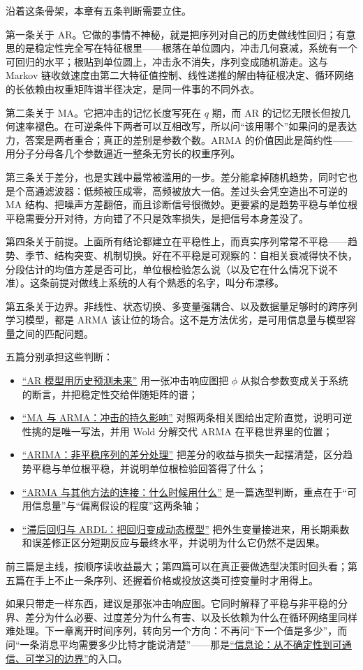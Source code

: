 沿着这条骨架，本章有五条判断需要立住。

第一条关于 AR。它做的事情不神秘，就是把序列对自己的历史做线性回归；有意思的是稳定性完全写在特征根里——根落在单位圆内，冲击几何衰减，系统有一个可回归的水平；根贴到单位圆上，冲击永不消失，序列变成随机游走。这与 Markov 链收敛速度由第二大特征值控制、线性递推的解由特征根决定、循环网络的长依赖由权重矩阵谱半径决定，是同一件事的不同外衣。

第二条关于 MA。它把冲击的记忆长度写死在 \(q\) 期，而 AR 的记忆无限长但按几何速率褪色。在可逆条件下两者可以互相改写，所以问``该用哪个''如果问的是表达力，答案是两者重合；真正的差别是参数个数。ARMA 的价值因此是简约性——用分子分母各几个参数逼近一整条无穷长的权重序列。

第三条关于差分，也是实践中最常被滥用的一步。差分能拿掉随机趋势，同时它也是个高通滤波器：低频被压成零，高频被放大一倍。差过头会凭空造出不可逆的 MA 结构、把噪声方差翻倍，而且诊断信号很微妙。更要紧的是趋势平稳与单位根平稳需要分开对待，方向错了不只是效率损失，是把信号本身差没了。

第四条关于前提。上面所有结论都建立在平稳性上，而真实序列常常不平稳——趋势、季节、结构突变、机制切换。好在不平稳是可观察的：自相关衰减得快不快，分段估计的均值方差是否可比，单位根检验怎么说（以及它在什么情况下说不准）。这条前提对做线上系统的人有个熟悉的名字，叫分布漂移。

第五条关于边界。非线性、状态切换、多变量强耦合、以及数据量足够时的跨序列学习模型，都是 ARMA 该让位的场合。这不是方法优劣，是可用信息量与模型容量之间的匹配问题。

五篇分别承担这些判断：

\begin{itemize}
\tightlist
\item \hyperref[sec:06-Random-Processes/06-ARMA-and-ARIMA/01]{``AR 模型用历史预测未来''} 用一张冲击响应图把 \(\phi\) 从拟合参数变成关于系统的断言，并把稳定性交给伴随矩阵的谱；
\item \hyperref[sec:06-Random-Processes/06-ARMA-and-ARIMA/02]{``MA 与 ARMA：冲击的持久影响''} 对照两条相关图给出定阶直觉，说明可逆性挑的是唯一写法，并用 Wold 分解交代 ARMA 在平稳世界里的位置；
\item \hyperref[sec:06-Random-Processes/06-ARMA-and-ARIMA/03]{``ARIMA：非平稳序列的差分处理''} 把差分的收益与损失一起摆清楚，区分趋势平稳与单位根平稳，并说明单位根检验回答得了什么；
\item \hyperref[sec:06-Random-Processes/06-ARMA-and-ARIMA/04]{``ARMA 与其他方法的连接：什么时候用什么''} 是一篇选型判断，重点在于``可用信息量''与``偏离假设的程度''这两条轴；
\item \hyperref[sec:06-Random-Processes/06-ARMA-and-ARIMA/05]{``滞后回归与 ARDL：把回归变成动态模型''} 把外生变量接进来，用长期乘数和误差修正区分短期反应与最终水平，并说明为什么它仍然不是因果。
\end{itemize}

前三篇是主线，按顺序读收益最大；第四篇可以在真正要做选型决策时回头看；第五篇在手上不止一条序列、还握着价格或投放这类可控变量时才用得上。

如果只带走一样东西，建议是那张冲击响应图。它同时解释了平稳与非平稳的分界、差分为什么必要、过度差分为什么有害、以及长依赖为什么在循环网络里同样难处理。下一章离开时间序列，转向另一个方向：不再问``下一个值是多少''，而问``一条消息平均需要多少比特才能说清楚''——那是\hyperref[ch:053]{``信息论：从不确定性到可通信、可学习的边界''}的入口。
